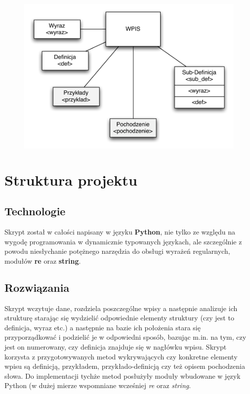 \documentclass[12pt]{article}
\begin{document}
\begin{figure}[h]
  \centerline{
    \includegraphics[scale=0.75]{images/structure.pdf}
  }
\end{figure}


\section{Struktura projektu}
\subsection{Technologie}
Skrypt został w całości napisany w języku \textbf{Python}, nie tylko ze względu na wygodę programowania
w dynamicznie typowanych językach, ale szczególnie z powodu niesłychanie potężnego narzędzia do obsługi
wyrażeń regularnych, modułów \textbf{re} oraz \textbf{string}.

\subsection{Rozwiązania}
Skrypt wczytuje dane, rozdziela poszczególne wpisy a następnie analizuje ich strukturę starając się wydzielić
odpowiednie elementy struktury (czy jest to definicja, wyraz etc.) a następnie na bazie ich położenia stara 
się przyporządkować i podzielić je w odpowiedni sposób, bazując m.in. na tym, czy jest on numerowany, czy definicja znajduje się w 
nagłówku wpisu.
Skrypt korzysta z przygotowywanych metod wykrywających czy konkretne elementy wpisu są definicją, przykładem, przykłado-definicją 
czy też opisem pochodzenia słowa. Do implementacji tychże metod posłużyły moduły wbudowane w język Python (w dużej mierze wspomniane
wcześniej \textit{re} oraz \textit{string}.
\end{document}
